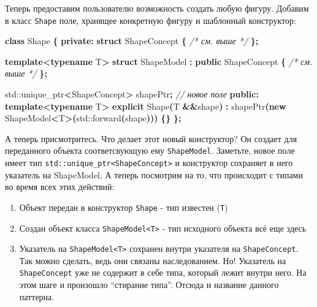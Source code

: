 \documentclass[14pt,a4paper]{article}
\providecommand{\tightlist}{%
	\setlength{\itemsep}{0pt}\setlength{\parskip}{0pt}}
\newenvironment{Shaded}{\begin{paragraph}}{\end{paragraph}}
\newenvironment{Highlighting}{\begin{paragraph}}{\end{paragraph}}
\newcommand{\KeywordTok}[1]{\textcolor[rgb]{0.13,0.29,0.53}{\textbf{#1}}}
\newcommand{\CommentTok}[1]{\textcolor[rgb]{0.56,0.35,0.01}{\textit{#1}}}
\newcommand{\OperatorTok}[1]{\textcolor[rgb]{0.81,0.36,0.00}{\textbf{#1}}}
\newcommand{\BuiltInTok}[1]{#1}
\newcommand{\NormalTok}[1]{#1}
\begin{document}
Теперь предоставим пользователю возможность создать любую фигуру.
Добавим в класс \texttt{Shape} поле, хранящее конкретную фигуру и
шаблонный конструктор:

\begin{Shaded}
\begin{Highlighting}[]
\KeywordTok{class}\NormalTok{ Shape }\OperatorTok{\{}
\KeywordTok{private}\OperatorTok{:}
    \KeywordTok{struct}\NormalTok{ ShapeConcept }\OperatorTok{\{} \CommentTok{/* см. выше */} \OperatorTok{\};}

    \KeywordTok{template}\OperatorTok{\textless{}}\KeywordTok{typename}\NormalTok{ T}\OperatorTok{\textgreater{}}
    \KeywordTok{struct}\NormalTok{ ShapeModel }\OperatorTok{:} \KeywordTok{public}\NormalTok{ ShapeConcept }\OperatorTok{\{} \CommentTok{/* см. выше */} \OperatorTok{\};}
    
    \BuiltInTok{std::}\NormalTok{unique\_ptr}\OperatorTok{\textless{}}\NormalTok{ShapeConcept}\OperatorTok{\textgreater{}}\NormalTok{ shapePtr}\OperatorTok{;} \CommentTok{// новое поле}
\KeywordTok{public}\OperatorTok{:}
    \KeywordTok{template}\OperatorTok{\textless{}}\KeywordTok{typename}\NormalTok{ T}\OperatorTok{\textgreater{}}
    \KeywordTok{explicit}\NormalTok{ Shape}\OperatorTok{(}\NormalTok{T }\OperatorTok{\&\&}\NormalTok{shape}\OperatorTok{)} 
        \OperatorTok{:}\NormalTok{ shapePtr}\OperatorTok{(}\KeywordTok{new}\NormalTok{ ShapeModel}\OperatorTok{\textless{}}\NormalTok{T}\OperatorTok{\textgreater{}(}\BuiltInTok{std::}\NormalTok{forward}\OperatorTok{(}\NormalTok{shape}\OperatorTok{)))} \OperatorTok{\{\}}
\OperatorTok{\};}
\end{Highlighting}
\end{Shaded}

А теперь присмотритесь. Что делает этот новый конструктор? Он создает
для переданного объекта соответсвующую ему \texttt{ShapeModel}.
Заметьте, новое поле имеет тип
\texttt{std::unique\_ptr\textless{}ShapeConcept\textgreater{}} и
конструктор сохраняет в него указатель на ShapeModel. А теперь посмотрим
на то, что происходит с типами во время всех этих действий:

\begin{enumerate}
\def\labelenumi{\arabic{enumi}.}
\tightlist
\item
  Объект передан в конструктор \texttt{Shape} - тип известен
  (\texttt{T})
\item
  Создан объект класса \texttt{ShapeModel\textless{}T\textgreater{}} -
  тип исходного объекта всё еще здесь
\item
  Указатель на \texttt{ShapeModel\textless{}T\textgreater{}} сохранен
  внутри указателя на \texttt{ShapeConcept}. Так можно сделать, ведь они
  связаны наследованием. Но! Указатель на \texttt{ShapeConcept} уже не
  содержит в себе типа, который лежит внутри него. На этом шаге и
  произошло ``стирание типа''. Отсюда и название данного паттерна.
\end{enumerate}
\end{document}
